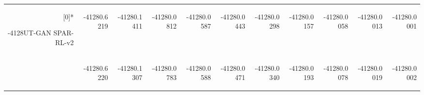 \begin{table}[htbp]
\begin{tabular}{rrrrrrrrrrr}
    \rowcolor[rgb]{ 0,  0,  0} \multirow{2}[0]{*}{\begin{turn}{-4128}UT-GAN SPAR-RL-v2\end{turn}} & \begin{turn}{-4128}0.6219 \end{turn} & \begin{turn}{-4128}0.1411 \end{turn} & \begin{turn}{-4128}0.0812 \end{turn} & \begin{turn}{-4128}0.0587 \end{turn} & \begin{turn}{-4128}0.0443 \end{turn} & \begin{turn}{-4128}0.0298 \end{turn} & \begin{turn}{-4128}0.0157 \end{turn} & \begin{turn}{-4128}0.0058 \end{turn} & \begin{turn}{-4128}0.0013 \end{turn} & \begin{turn}{-4128}0.0001 \end{turn} \\
    \rowcolor[rgb]{ 0,  0,  0}       & \begin{turn}{-4128}0.6220 \end{turn} & \begin{turn}{-4128}0.1307 \end{turn} & \begin{turn}{-4128}0.0783 \end{turn} & \begin{turn}{-4128}0.0588 \end{turn} & \begin{turn}{-4128}0.0471 \end{turn} & \begin{turn}{-4128}0.0340 \end{turn} & \begin{turn}{-4128}0.0193 \end{turn} & \begin{turn}{-4128}0.0078 \end{turn} & \begin{turn}{-4128}0.0019 \end{turn} & \begin{turn}{-4128}0.0002 \end{turn} \\
    \end{tabular}%
  \label{tab:addlabel}%
\end{table}%
